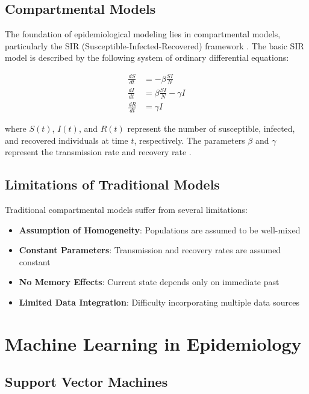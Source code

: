 \documentclass[12pt,a4paper]{report}
\begin{document}
\subsection{Compartmental Models}

The foundation of epidemiological modeling lies in compartmental models, particularly the SIR (Susceptible-Infected-Recovered) framework \autocite{kermack_mckendrick_1927}. The basic SIR model is described by the following system of ordinary differential equations:

\begin{align}
\frac{dS}{dt} &= -\beta \frac{SI}{N} \\
\frac{dI}{dt} &= \beta \frac{SI}{N} - \gamma I \\
\frac{dR}{dt} &= \gamma I
\end{align}

where $S(t)$, $I(t)$, and $R(t)$ represent the number of susceptible, infected, and recovered individuals at time $t$, respectively. The parameters $\beta$ and $\gamma$ represent the transmission rate and recovery rate \autocite{anderson_may_1991}.

\subsection{Limitations of Traditional Models}

Traditional compartmental models suffer from several limitations:

\begin{itemize}
    \item \textbf{Assumption of Homogeneity}: Populations are assumed to be well-mixed
    \item \textbf{Constant Parameters}: Transmission and recovery rates are assumed constant
    \item \textbf{No Memory Effects}: Current state depends only on immediate past
    \item \textbf{Limited Data Integration}: Difficulty incorporating multiple data sources
\end{itemize}

\section{Machine Learning in Epidemiology}

\subsection{Support Vector Machines}
\end{document}
